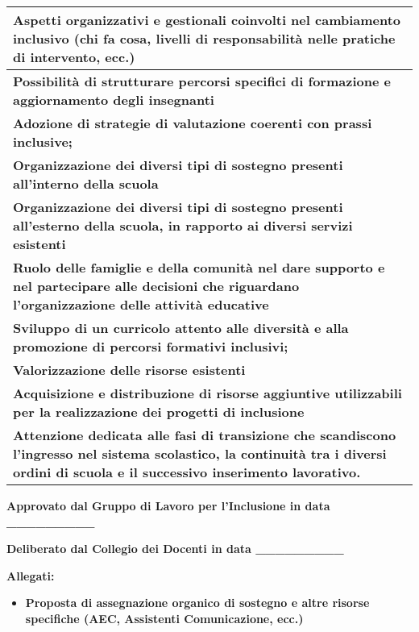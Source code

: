 \documentclass[a4paper]{article}
\newcommand\liststyleWWviiiNumii{%
\renewcommand\labelitemi{[F0D8?]}
\renewcommand\labelitemii{o}
\renewcommand\labelitemiii{${\blacksquare}$}
\renewcommand\labelitemiv{{\textbullet}}
}
\begin{document}
\bigskip

\begin{flushleft}
\tablefirsthead{}
\tablehead{}
\tabletail{}
\tablelasttail{}
\begin{supertabular}{|m{17.064999cm}|}
\hline
{ \textsf{\textbf{Aspetti organizzativi e gestionali coinvolti nel cambiamento inclusivo
}}\textsf{(chi fa cosa, livelli di responsabilit\`a nelle pratiche di intervento, ecc.)}\textsf{\textbf{ }}}\\\hline
{\sffamily\bfseries Possibilit\`a di strutturare percorsi specifici di formazione e
aggiornamento degli insegnanti}\\\hline
{\sffamily\bfseries Adozione di strategie di valutazione coerenti con prassi inclusive;}\\\hline
{\sffamily\bfseries Organizzazione dei diversi tipi di sostegno presenti all'interno della
scuola}\\\hline
{\sffamily\bfseries Organizzazione dei diversi tipi di sostegno presenti all'esterno della
scuola, in rapporto ai diversi servizi esistenti}\\\hline
{\sffamily\bfseries Ruolo delle famiglie e della comunit\`a nel dare supporto e nel partecipare
alle decisioni che riguardano l'organizzazione delle attivit\`a educative}\\\hline
{\sffamily\bfseries Sviluppo di un curricolo attento alle diversit\`a e alla promozione di
percorsi formativi inclusivi;}\\\hline
{\sffamily\bfseries Valorizzazione delle risorse esistenti}\\\hline
{\sffamily\bfseries Acquisizione e distribuzione di risorse aggiuntive utilizzabili per la
realizzazione dei progetti di inclusione}\\\hline
{\sffamily\bfseries Attenzione dedicata alle fasi di transizione che scandiscono l'ingresso nel
sistema scolastico, la continuit\`a tra i diversi ordini di scuola e il successivo inserimento lavorativo.}\\\hline
\end{supertabular}
\end{flushleft}

\bigskip

{\sffamily\bfseries
Approvato dal Gruppo di Lavoro per l'Inclusione in data \_\_\_\_\_\_\_\_\_}

{\sffamily\bfseries
Deliberato dal Collegio dei Docenti in data \_\_\_\_\_\_\_\_\_}


\bigskip

{\sffamily\bfseries
Allegati: }

\liststyleWWviiiNumii
\begin{itemize}
\item {\sffamily\bfseries
Proposta di assegnazione organico di sostegno e altre risorse specifiche (AEC, Assistenti Comunicazione, ecc.)}
\end{itemize}

\bigskip
\end{document}
